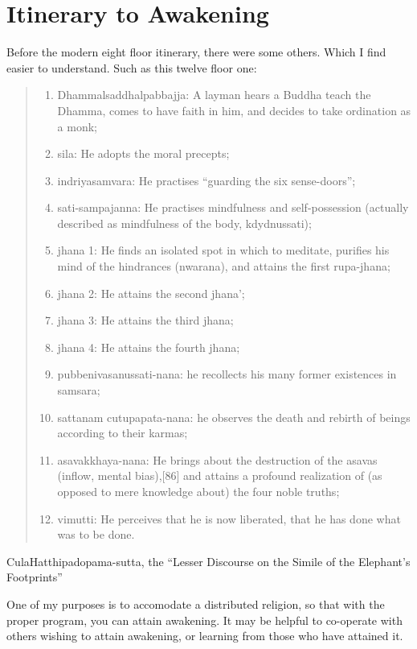 \part{Itinerary to Awakening}
\label{awakening}

Before the modern eight floor itinerary, there were some others. Which I find
easier to understand. Such as this twelve floor one:

\blockquote{\begin{enumerate}
  \item  Dhammalsaddhalpabbajja: A layman hears a Buddha teach the Dhamma, comes to have faith in him, and decides to take ordination as a monk;
  \item  sila: He adopts the moral precepts;
  \item  indriyasamvara: He practises ``guarding the six sense-doors'';
  \item  sati-sampajanna: He practises mindfulness and self-possession (actually described as mindfulness of the body, kdydnussati);
  \item  jhana 1: He finds an isolated spot in which to meditate, purifies his mind of the hindrances (nwarana), and attains the first rupa-jhana;
  \item  jhana 2: He attains the second jhana';
  \item  jhana 3: He attains the third jhana;
  \item  jhana 4: He attains the fourth jhana;
  \item  pubbenivasanussati-nana: he recollects his many former existences in samsara;
  \item  sattanam cutupapata-nana: he observes the death and rebirth of beings according to their karmas;
  \item  asavakkhaya-nana: He brings about the destruction of the asavas (inflow, mental bias),[86] and attains a profound realization of (as opposed to mere knowledge about) the four noble truths;
  \item  vimutti: He perceives that he is now liberated, that he has done what was to be done.
\end{enumerate}}{CulaHatthipadopama-sutta, the ``Lesser Discourse on the Simile of
the Elephant's Footprints''}

One of my purposes is to accomodate a distributed religion, 
so that with the proper program, you can attain awakening.
It may be helpful to co-operate with others wishing to attain awakening,
or learning from those who have attained it.

